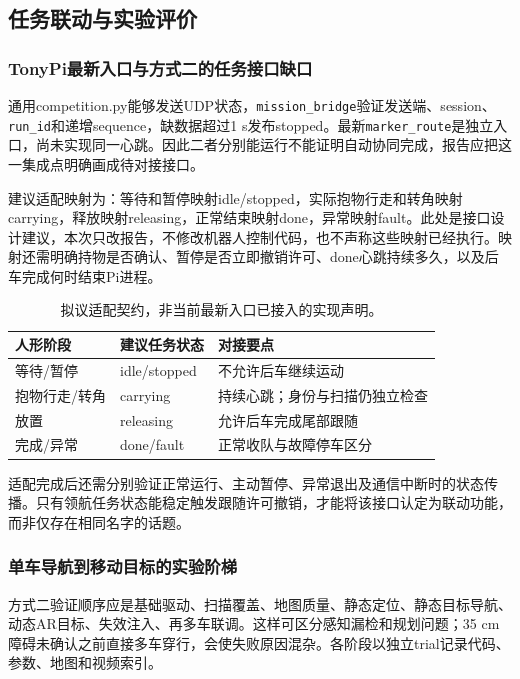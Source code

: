 \subsection{任务联动与实验评价}
\subsubsection{TonyPi最新入口与方式二的任务接口缺口}
通用competition.py能够发送UDP状态，\texttt{mission\_\allowbreak bridge}验证发送端、session、\texttt{run\_\allowbreak id}和递增sequence，缺数据超过1 s发布stopped。最新\texttt{marker\_\allowbreak route}是独立入口，尚未实现同一心跳。因此二者分别能运行不能证明自动协同完成，报告应把这一集成点明确画成待对接接口。

建议适配映射为：等待和暂停映射idle/stopped，实际抱物行走和转角映射carrying，释放映射releasing，正常结束映射done，异常映射fault。此处是接口设计建议，本次只改报告，不修改机器人控制代码，也不声称这些映射已经执行。映射还需明确持物是否确认、暂停是否立即撤销许可、done心跳持续多久，以及后车完成何时结束Pi进程。
\begin{table}[H]\centering\small\begin{tabularx}{\linewidth}{p{33mm}p{30mm}Y}\toprule 人形阶段 & 建议任务状态 & 对接要点\\\midrule
等待/暂停 & idle/stopped & 不允许后车继续运动\\
抱物行走/转角 & carrying & 持续心跳；身份与扫描仍独立检查\\
放置 & releasing & 允许后车完成尾部跟随\\
完成/异常 & done/fault & 正常收队与故障停车区分\\\bottomrule\end{tabularx}\caption{拟议适配契约，非当前最新入口已接入的实现声明。}\end{table}

适配完成后还需分别验证正常运行、主动暂停、异常退出及通信中断时的状态传播。只有领航任务状态能稳定触发跟随许可撤销，才能将该接口认定为联动功能，而非仅存在相同名字的话题。


\subsubsection{单车导航到移动目标的实验阶梯}
方式二验证顺序应是基础驱动、扫描覆盖、地图质量、静态定位、静态目标导航、动态AR目标、失效注入、再多车联调。这样可区分感知漏检和规划问题；35 cm障碍未确认之前直接多车穿行，会使失败原因混杂。各阶段以独立trial记录代码、参数、地图和视频索引。

